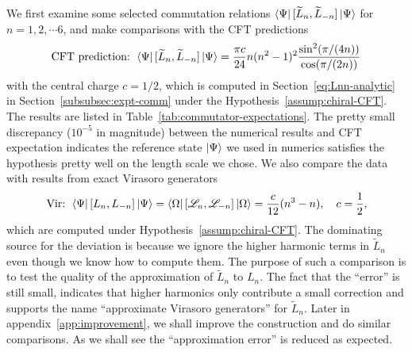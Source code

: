 \documentclass[12pt, nofootinbib]{article}
\theoremstyle{plain}
\theoremstyle{assumption}
\theoremstyle{definition}
\theoremstyle{plain}
\theoremstyle{plain}
\theoremstyle{plain}
\theoremstyle{plain}
\theoremstyle{plain}
\def\Leff{\widetilde{L}}
\def\Lcft{\mathscr{L}}
\begin{document}
We first examine some selected commutation relations $\bra{\Psi} [\Leff_n, \Leff_{-n}] \ket{\Psi}$ for $n = 1,2,\cdots 6$, and make comparisons with the CFT predictions
\begin{equation}\label{eq:Lnn-cft}
    \text{CFT prediction: }\bra{\Psi} [\Leff_n, \Leff_{-n}] \ket{\Psi} = \frac{\pi c}{24} n(n^2-1)^2 \frac{\sin^2(\pi/(4n))}{\cos(\pi/(2n))}  
\end{equation}
with the central charge $c=1/2$, which is computed in Section~\eqref{eq:Lnn-analytic} in Section~\ref{subsubsec:expt-comm} under the Hypothesis~\ref{assump:chiral-CFT}. The results are listed in Table~\ref{tab:commutator-expectations}. The pretty small discrepancy ($10^{-5}$ in magnitude) between the numerical results and CFT expectation indicates the reference state $\left|\Psi\right\rangle$ we used in numerics satisfies the hypothesis pretty well on the length scale we chose. We also compare the data with results from exact Virasoro generators  
\begin{equation}\label{eq:Lnn-vir}
    \text{Vir: }  \bra{\Psi} [L_n,L_{-n}] \ket{\Psi}  = \bra{\Omega} [\Lcft_n,\Lcft_{-n}] \ket{\Omega} = \frac{c}{12} (n^3-n), \quad c=\frac{1}{2},
\end{equation}
which are computed under Hypothesis~\ref{assump:chiral-CFT}. The dominating source for the deviation is because we ignore the higher harmonic terms in $\Leff_n$ even though we know how to compute them. The purpose of such a comparison is to test the quality of the approximation of $\Leff_n$ to $L_n$. The fact that the ``error'' is still small, indicates that higher harmonics only contribute a small correction and supports the name ``approximate Virasoro generators'' for $\Leff_n$. Later in appendix~\ref{app:improvement}, we shall improve the construction and do similar comparisons. As we shall see the ``approximation error'' is reduced as expected. 
\end{document}
